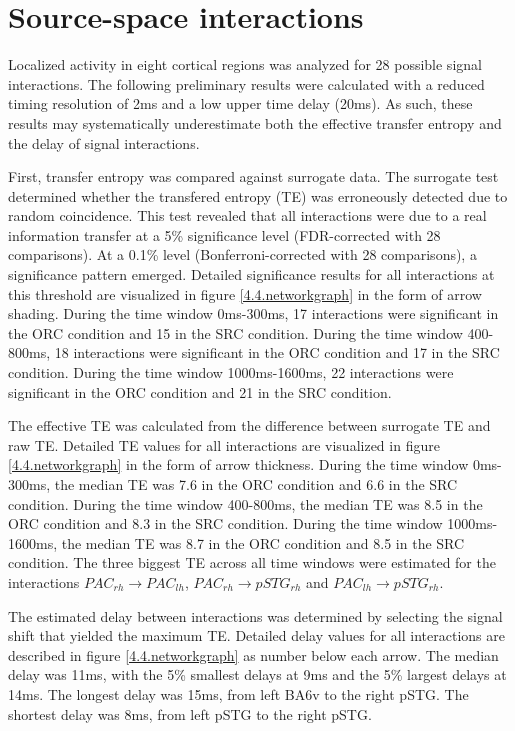 \section{Source-space interactions}

Localized activity in eight cortical regions was analyzed for 28 possible signal interactions.
The following preliminary results were calculated with a reduced timing resolution of 2ms and a low upper time delay (20ms).
As such, these results may systematically underestimate both the effective transfer entropy and the delay of signal interactions.

First, transfer entropy was compared against surrogate data.
The surrogate test determined whether the transfered entropy (TE) was erroneously detected due to random coincidence.
This test revealed that all interactions were due to a real information transfer at a 5\% significance level (FDR-corrected with 28 comparisons).
At a 0.1\% level (Bonferroni-corrected with 28 comparisons), a significance pattern emerged.
Detailed significance results for all interactions at this threshold are visualized in figure \ref{4.4.networkgraph} in the form of arrow shading.
During the time window 0ms-300ms, 17 interactions were significant in the ORC condition and 15 in the SRC condition.
During the time window 400-800ms, 18 interactions were significant in the ORC condition and 17 in the SRC condition.
During the time window 1000ms-1600ms, 22 interactions were significant in the ORC condition and 21 in the SRC condition.

The effective TE was calculated from the difference between surrogate TE and raw TE.
Detailed TE values for all interactions are visualized in figure \ref{4.4.networkgraph} in the form of arrow thickness.
During the time window 0ms-300ms, the median TE was 7.6 in the ORC condition and 6.6 in the SRC condition.
During the time window 400-800ms, the median TE was 8.5 in the ORC condition and 8.3 in the SRC condition.
During the time window 1000ms-1600ms, the median TE was 8.7 in the ORC condition and 8.5 in the SRC condition.
The three biggest TE across all time windows were estimated for the interactions $PAC_{rh} \rightarrow PAC_{lh}$, $PAC_{rh} \rightarrow pSTG_{rh}$ and $PAC_{lh} \rightarrow pSTG_{rh}$.

The estimated delay between interactions was determined by selecting the signal shift that yielded the maximum TE.
Detailed delay values for all interactions are described in figure \ref{4.4.networkgraph} as number below each arrow.
The median delay was 11ms, with the 5\% smallest delays at 9ms and the 5\% largest delays at 14ms.
The longest delay was 15ms, from left BA6v to the right pSTG.
The shortest delay was 8ms, from left pSTG to the right pSTG.

